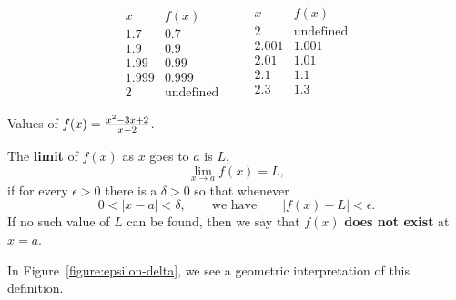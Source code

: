 \begin{margintable}[-1in]
\[
\begin{array}{c|c}
 x & f(x) \\ \hline
 1.7 &  0.7 \\
 1.9 &  0.9 \\
 1.99 &  0.99 \\
 1.999 &  0.999 \\
  2 &  \text{undefined}
\end{array}\qquad
\begin{array}{c|c}
 x & f(x) \\ \hline
  2 & \text{undefined}\\
 2.001&  1.001\\
 2.01&  1.01\\
 2.1 &  1.1 \\
 2.3 &  1.3 \\
\end{array}
\]
\caption{Values of $f(x)=\protect\frac{x^2 - 3x + 2}{x-2}$.}
\label{table:(x^2 - 3x + 2)/(x-2)}
\end{margintable}

\begin{definition}\label{def:limit}
The \textbf{limit} of $f(x)$ as $x$ goes to $a$ is $L$,
\[
\lim_{x\to a}f(x)=L,
\] 
if for every $\epsilon>0$ there is a $\delta > 0$ so that whenever
\[
0 < |x-a| < \delta, \qquad\text{we have} \qquad |f(x)-L|<\epsilon.
\] 
If no such value of $L$ can be
found, then we say that $f(x)$ \textbf{does not exist} at $x=a$.
\end{definition}

In Figure~\ref{figure:epsilon-delta}, we see a geometric
interpretation of this definition.

